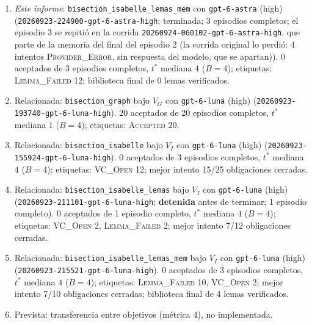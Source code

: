 \documentclass[11pt,a4paper]{article}
\begin{document}
{\raggedright
\begin{enumerate}
  \item \emph{Este informe}: \texttt{bisection\_\allowbreak{}isabelle\_\allowbreak{}lemas\_\allowbreak{}mem} con \texttt{gpt-\allowbreak{}6-\allowbreak{}astra} (high) (\texttt{20260923-\allowbreak{}224900-\allowbreak{}gpt-\allowbreak{}6-\allowbreak{}astra-\allowbreak{}high}; terminada; 3 episodios completos; el episodio 3 se repitió en la corrida \texttt{20260924-\allowbreak{}060102-\allowbreak{}gpt-\allowbreak{}6-\allowbreak{}astra-\allowbreak{}high}, que parte de la memoria del final del episodio 2 (la corrida original lo perdió: 4 intentos \textsc{Provider\_Error}, sin respuesta del modelo, que se apartan)). 0 aceptados de 3 episodios completos, $t^*$ mediana $4$ ($B = 4$); etiquetas: \textsc{Lemma\_Failed} 12; biblioteca final de 0 lemas verificados.
  \item Relacionada: \texttt{bisection\_\allowbreak{}graph} bajo $V_G$ con \texttt{gpt-\allowbreak{}6-\allowbreak{}luna} (high) (\texttt{20260923-\allowbreak{}193740-\allowbreak{}gpt-\allowbreak{}6-\allowbreak{}luna-\allowbreak{}high}). 20 aceptados de 20 episodios completos, $t^*$ mediana $1$ ($B = 4$); etiquetas: \textsc{Accepted} 20.
  \item Relacionada: \texttt{bisection\_\allowbreak{}isabelle} bajo $V_I$ con \texttt{gpt-\allowbreak{}6-\allowbreak{}luna} (high) (\texttt{20260923-\allowbreak{}155924-\allowbreak{}gpt-\allowbreak{}6-\allowbreak{}luna-\allowbreak{}high}). 0 aceptados de 3 episodios completos, $t^*$ mediana $4$ ($B = 4$); etiquetas: \textsc{VC\_Open} 12; mejor intento 15/25 obligaciones cerradas.
  \item Relacionada: \texttt{bisection\_\allowbreak{}isabelle\_\allowbreak{}lemas} bajo $V_I$ con \texttt{gpt-\allowbreak{}6-\allowbreak{}luna} (high) (\texttt{20260923-\allowbreak{}211101-\allowbreak{}gpt-\allowbreak{}6-\allowbreak{}luna-\allowbreak{}high}; \textbf{detenida} antes de terminar; 1 episodio completo). 0 aceptados de 1 episodio completo, $t^*$ mediana $4$ ($B = 4$); etiquetas: \textsc{VC\_Open} 2, \textsc{Lemma\_Failed} 2; mejor intento 7/12 obligaciones cerradas.
  \item Relacionada: \texttt{bisection\_\allowbreak{}isabelle\_\allowbreak{}lemas\_\allowbreak{}mem} bajo $V_I$ con \texttt{gpt-\allowbreak{}6-\allowbreak{}luna} (high) (\texttt{20260923-\allowbreak{}215521-\allowbreak{}gpt-\allowbreak{}6-\allowbreak{}luna-\allowbreak{}high}). 0 aceptados de 3 episodios completos, $t^*$ mediana $4$ ($B = 4$); etiquetas: \textsc{Lemma\_Failed} 10, \textsc{VC\_Open} 2; mejor intento 7/10 obligaciones cerradas; biblioteca final de 4 lemas verificados.
  \item Prevista: transferencia entre objetivos (métrica 4), no implementada.
\end{enumerate}
\par}
\end{document}

